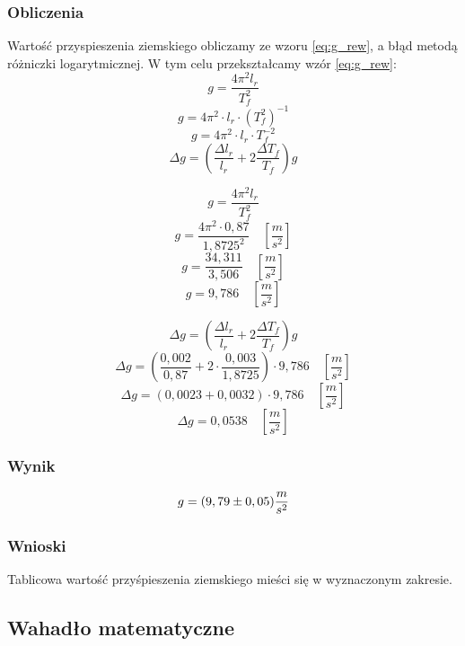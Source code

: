 \documentclass[a4paper, 11pt]{article}
\begin{document}
\subsubsection{Obliczenia}
Wartość przyspieszenia ziemskiego obliczamy ze wzoru \eqref{eq:g_rew},
a błąd metodą różniczki logarytmicznej.
W tym celu przekształcamy wzór \eqref{eq:g_rew}:
\[
	g = \frac{4\pi^2l_r}{T^2_f}
\]
\[
	g = 4\pi^2 \cdot l_r \cdot\left(T^2_f\right)^{-1}
\]
\[
	g = 4\pi^2\cdot l_r \cdot T^{-2}_f
\]
\begin{equation}
	\Delta g = \left( \frac{\Delta l_r}{l_r} +2\frac{\Delta T_f}{T_f} \right)g
\end{equation}

\begin{multicols}{2}
	\[
		g = \frac{4\pi^2l_r}{T^2_f}
	\]
	\[
		g = \frac{4\pi^2 \cdot 0,87}{1,8725^2} \quad [\frac{m}{s^2}]
	\]
	\[
		g = \frac{34,311}{3,506} \quad[\frac{m}{s^2}]
	\]
	\[
		g = 9,786 \quad[\frac{m}{s^2}]
	\]

	\columnbreak

	\[
		\Delta g = \left( \frac{\Delta l_r}{l_r} +2\frac{\Delta T_f}{T_f} \right)g
	\]
	\[
		\Delta g = \left( \frac{0,002}{0,87} +2 \cdot \frac{0,003}{1,8725} \right) \cdot 9,786 \quad [\frac{m}{s^2}]
	\]
	\[
		\Delta g = \left( 0,0023 + 0,0032 \right) \cdot 9,786 \quad [\frac{m}{s^2}]
	\]
	\[
		\Delta g = 0,0538 \quad [\frac{m}{s^2}]
	\]
\end{multicols}

\subsubsection{Wynik}
\begin{equation}
	\huge  g = (9,79 \pm 0,05) \frac{m}{s^2}
\end{equation}


\subsubsection{Wnioski}
Tablicowa wartość przyśpieszenia ziemskiego mieści się w wyznaczonym zakresie.

\subsection{Wahadło matematyczne}
\end{document}
